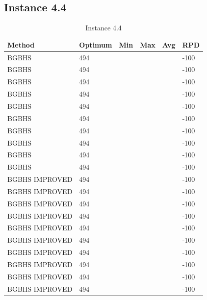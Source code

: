 \subsection{Instance 4.4}
\begin{table}[H]
\centering
\begin{tabular}{ | l | l | l | l | l | l | }
\hline
	Method & Optimum & Min & Max & Avg & RPD \\ \hline
	BGBHS & 494 &  &  &  & -100 \\ \hline
	BGBHS & 494 &  &  &  & -100 \\ \hline
	BGBHS & 494 &  &  &  & -100 \\ \hline
	BGBHS & 494 &  &  &  & -100 \\ \hline
	BGBHS & 494 &  &  &  & -100 \\ \hline
	BGBHS & 494 &  &  &  & -100 \\ \hline
	BGBHS & 494 &  &  &  & -100 \\ \hline
	BGBHS & 494 &  &  &  & -100 \\ \hline
	BGBHS & 494 &  &  &  & -100 \\ \hline
	BGBHS & 494 &  &  &  & -100 \\ \hline
	BGBHS IMPROVED & 494 &  &  &  & -100 \\ \hline
	BGBHS IMPROVED & 494 &  &  &  & -100 \\ \hline
	BGBHS IMPROVED & 494 &  &  &  & -100 \\ \hline
	BGBHS IMPROVED & 494 &  &  &  & -100 \\ \hline
	BGBHS IMPROVED & 494 &  &  &  & -100 \\ \hline
	BGBHS IMPROVED & 494 &  &  &  & -100 \\ \hline
	BGBHS IMPROVED & 494 &  &  &  & -100 \\ \hline
	BGBHS IMPROVED & 494 &  &  &  & -100 \\ \hline
	BGBHS IMPROVED & 494 &  &  &  & -100 \\ \hline
	BGBHS IMPROVED & 494 &  &  &  & -100 \\ \hline
\end{tabular}

\caption{Instance 4.4}
\label{tblscp44}
\end{table}
\newpage

